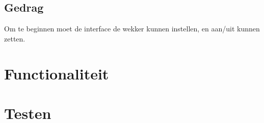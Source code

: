 \subsection{Gedrag}
Om te beginnen moet de interface de wekker kunnen instellen, en aan/uit kunnen zetten. 

\section{Functionaliteit}

\section{Testen}
